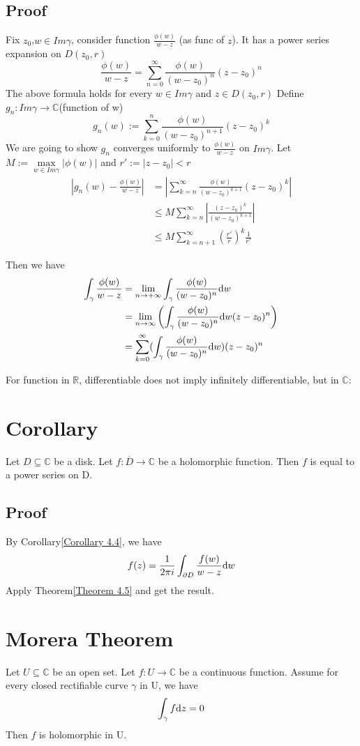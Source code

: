 \documentclass{book}
\newcommand{\abs}[1]{\left\lvert #1 \right\rvert}
\begin{document}
\subsection*{Proof}
Fix $z_0$,$w\in Im\gamma$, consider function $\frac{\phi(w)}{w-z}$ (as func of $z$). It has a power series expansion on $D(z_0,r)$
$$\frac{\phi(w)}{w-z}=\sum\limits_{n=0}^\infty\frac{\phi(w)}{(w-z_0)^n}(z-z_0)^n$$
The above formula holds for every $w\in Im\gamma$ and $z\in D(z_0,r)$ Define $g_n:Im\gamma\to \mathbb C$(function of w)
$$g_n(w):=\sum\limits_{k=0}^n\frac{\phi(w)}{(w-z_0)^{n+1}}(z-z_0)^{k}$$
We are going to show $g_n$ converges uniformly to $\frac{\phi(w)}{w-z}$ on $Im\gamma$. Let $M:=\max\limits_{w\in Im\gamma}\abs{\phi(w)}$ and $r':=\abs{z-z_0}<r$
$$\begin{aligned}
    \abs{g_n(w)-\frac{\phi(w)}{w-z}}&=\abs{\sum\limits_{k=n}^\infty\frac{\phi(w)}{(w-z_0)^{k+1}}(z-z_0)^k}\\
    &\leq M\sum\limits_{k=n}^\infty\abs{\frac{(z-z_0)^k}{(w-z_0)^{k+1}}}\\
    &\leq M\sum\limits_{k=n+1}^\infty(\frac{r'}r)^k\frac{1}{r'}
\end{aligned}$$

Then we have 
$$\begin{aligned}
    \int_\gamma\frac{\phi(w)}{w-z}&=\lim\limits_{n\to+\infty}\int_\gamma\frac{\phi(w)}{(w-z_0)^n}\text dw\\
    &=\lim\limits_{n\to\infty}\left(\int_\gamma\frac{\phi(w)}{(w-z_0)^n}\text dw(z-z_0)^n\right)\\
    &=\sum\limits_{k=0}^\infty(\int_\gamma\frac{\phi(w)}{(w-z_0)^n}\text dw)(z-z_0)^n
\end{aligned}$$

For function in $\mathbb R$, differentiable does not imply infinitely differentiable, but in $\mathbb C$:
\section{Corollary}
Let $D\subseteq \mathbb C$ be a disk. Let $f:\overline D\to \mathbb C$ be a holomorphic function. Then $f$ is equal to a power series on D.
\subsection*{Proof}
By Corollary\ref{Corollary 4.4}, we have$$f(z)=\frac{1}{2\pi i}\int_{\partial D}\frac{f(w)}{w-z}\text dw$$
Apply Theorem\ref{Theorem 4.5} and get the result.
\section{Morera Theorem}
Let $U\subseteq \mathbb C$ be an open set. Let $f:U\to \mathbb C$ be a continuous function. Assume for every closed rectifiable curve $\gamma$ in U, we have $$\int_\gamma f\text dz=0$$Then $f$ is holomorphic in U.
\end{document}
